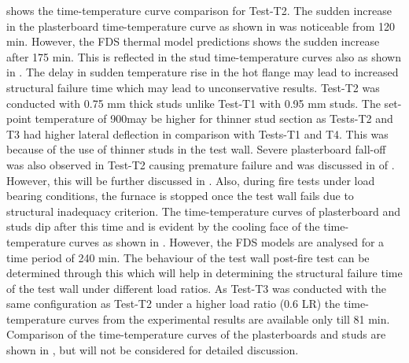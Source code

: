 shows the time-temperature curve comparison for Test-T2. The sudden increase in the plasterboard time-temperature curve as shown in  was noticeable from 120 min. However, the FDS thermal model predictions shows the sudden increase after 175 min. This is reflected in the stud time-temperature curves also as shown in . The delay in sudden temperature rise in the hot flange may lead to increased structural failure time which may lead to unconservative results. Test-T2 was conducted with 0.75 mm thick studs unlike Test-T1 with 0.95 mm studs. The set-point temperature of 900\degree may be higher for thinner stud section as Tests-T2 and T3 had higher lateral deflection in comparison with Tests-T1 and T4. This was because of the use of thinner studs in the test wall. Severe plasterboard fall-off was also observed in Test-T2 causing premature failure and was discussed in  of . However, this will be further discussed in . Also, during fire tests under load bearing conditions, the furnace is stopped once the test wall fails due to structural inadequacy criterion. The time-temperature curves of plasterboard and studs dip after this time and is evident by the cooling face of the time-temperature curves as shown in . However, the FDS models are analysed for a time period of 240 min. The behaviour of the test wall post-fire test can be determined through this which will help in determining the structural failure time of the test wall under different load ratios. As Test-T3 was conducted with the same configuration as Test-T2 under a higher load ratio (0.6 LR) the time-temperature curves from the experimental results are available only till 81 min. Comparison of the time-temperature curves of the plasterboards and studs are shown in , but will not be considered for detailed discussion.  

